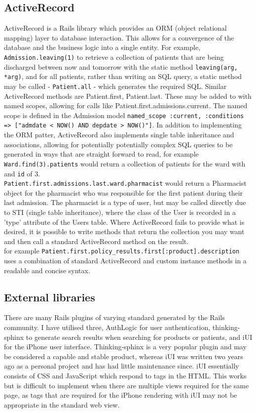 \documentclass[letterpaper]{amsart}
\begin{document}
\subsection{ActiveRecord}
ActiveRecord is a Rails library which provides an ORM (object relational mapping) layer to database interaction.  This allows for a convergence of the database and the business logic into a single entity.  For example, \texttt{Admission.leaving(1)} to retrieve a collection of patients that are being discharged between now and tomorrow with the static method \texttt{leaving(arg, *arg)}, and for all patients, rather than writing an SQL query, a static method may be called - \texttt{Patient.all} - which generates the required SQL. Similar ActiveRecord methods are Patient.first, Patient.last.  These may be added to with named scopes, allowing for calls like Patient.first.admissions.current.  The named scope is defined in the Admission model \texttt{named\_scope :current, :conditions =>  ["admdate <  NOW() AND depdate > NOW()"]}.  In addition to implementing the ORM patter, ActiveRecord also implements single table inheritance and associations, allowing for potentially potentially complex SQL queries to be generated in ways that are straight forward to read, for example \texttt{Ward.find(3).patients} would return a collection of patients for the ward with and \texttt{id} of 3.\\ \texttt{Patient.first.admissions.last.ward.pharmacist} would return a Pharmacist object for the pharmacist who was responsible for the first patient during their last admission.  The pharmacist is a type of user, but may be called directly due to STI (single table inheritance), where the class of the User is recorded in a 'type' attribute of the Users table.  Where ActiveRecord fails to provide what is desired, it is possible to write methods that return the collection you may want and then call a standard ActiveRecord method on the result.\\ for example \texttt{Patient.first.policy\_results.first[:product].description} uses a combination of standard ActiveRecord and custom instance methods in a readable and concise syntax.
\subsection{External libraries}
There are many Rails plugins of varying standard generated by the Rails community.  I have utilised three, AuthLogic for user authentication, thinking-sphinx to generate search results when searching for products or patients, and iUI for the iPhone user interface. Thinking-sphinx is a very popular plugin and may be considered a capable and stable product, whereas iUI was written two years ago as a personal project and has had little maintenance since. iUI essentially consists of CSS and JavaScript which respond to tags in the HTML.  This works but is difficult to implement when there are multiple views required for the same page, as tags that are required for the iPhone rendering with iUI may not be appropriate in the standard web view.
\end{document}
